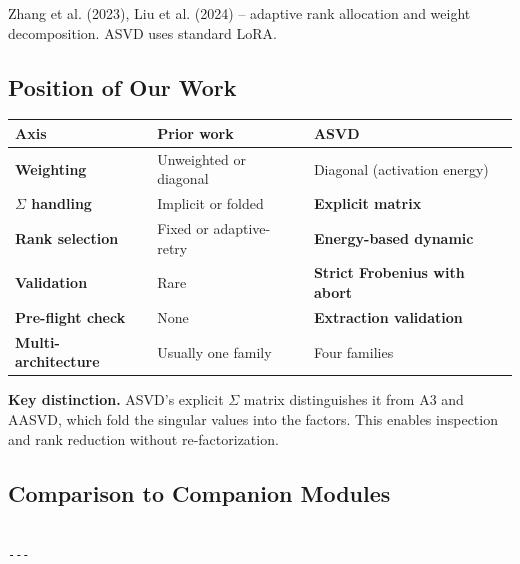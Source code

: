 Zhang et al. (2023), Liu et al. (2024) -- adaptive rank allocation and 
weight decomposition. ASVD uses standard LoRA.

\subsection{Position of Our Work}

\begin{table}[H]
\centering
\small
\begin{tabular}{lll}
\toprule
\textbf{Axis} & \textbf{Prior work} & \textbf{ASVD} \\
\midrule
\textbf{Weighting} & Unweighted or diagonal & Diagonal (activation energy) \\
\textbf{$\Sigma$ handling} & Implicit or folded & \textbf{Explicit matrix} \\
\textbf{Rank selection} & Fixed or adaptive-retry & \textbf{Energy-based dynamic} \\
\textbf{Validation} & Rare & \textbf{Strict Frobenius with abort} \\
\textbf{Pre-flight check} & None & \textbf{Extraction validation} \\
\textbf{Multi-architecture} & Usually one family & Four families \\
\bottomrule
\end{tabular}
\end{table}

\textbf{Key distinction.} ASVD's explicit $\Sigma$ matrix distinguishes it from 
A3 and AASVD, which fold the singular values into the factors. This enables 
inspection and rank reduction without re-factorization.

\subsection{Comparison to Companion Modules}

\begin{lstlisting}

---
\end{lstlisting}